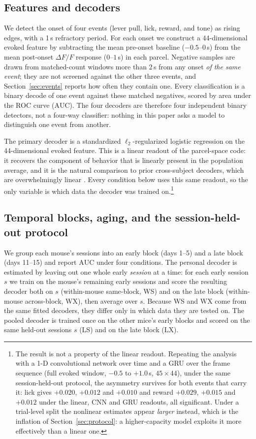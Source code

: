 \documentclass[mlmain,onecolumn]{jmlr}
\newcommand{\auc}{\mathrm{AUC}}
\begin{document}
\subsection{Features and decoders}
We detect the onset of four events (lever pull, lick, reward, and
tone) as rising edges, with a 1\,s refractory period. For each onset we construct a 44-dimensional
evoked feature by subtracting the mean pre-onset baseline ($-0.5$--$0$\,s) from the mean post-onset
$\Delta F/F$ response ($0$--$1$\,s) in each parcel. Negative samples are drawn from matched-count
windows more than 2\,s from any onset \emph{of the same event}; they are not screened against the
other three events, and Section~\ref{sec:events} reports how often they contain one. Every
classification is a binary decode of one event against these matched negatives, scored by area under
the ROC curve ($\auc$). The four decoders are therefore four independent binary detectors, not a
four-way classifier: nothing in this paper asks a model to distinguish one event from another.

The primary decoder is a standardized $\ell_2$-regularized logistic regression on
the 44-dimensional evoked feature. This is a linear readout of the parcel-space code: it recovers the
component of behavior that is linearly present in the population average, and it is the natural
comparison to prior cross-subject decoders, which are overwhelmingly linear
\citep{melbaum2022,peterson2021}. Every condition below uses this same readout, so the only variable
is which data the decoder was trained on.\footnote{The result is not a property of the linear
readout. Repeating the analysis with a 1-D convolutional network over time and a GRU over the frame
sequence (full evoked window, $-0.5$ to $+1.0$\,s, $45 \times 44$), under the same session-held-out
protocol, the asymmetry survives for both events that carry it: lick gives $+0.020$, $+0.012$ and
$+0.010$ and reward $+0.029$, $+0.015$ and $+0.012$ under the linear, CNN and GRU readouts, all
significant. Under a trial-level split the nonlinear estimates appear \emph{larger} instead, which is
the inflation of Section~\ref{sec:protocol}: a higher-capacity model exploits it more effectively
than a linear one.}

\subsection{Temporal blocks, aging, and the session-held-out protocol}
\label{sec:blocks}
We group each mouse's sessions into an early block (days 1--5)
and a late block (days 11--15) and report $\auc$ under four conditions. The personal decoder is
estimated by leaving out one whole early \emph{session} at a time: for each early session $s$ we
train on the mouse's remaining early sessions and score the resulting decoder both on $s$
(within-mouse same-block, WS) and on the late block (within-mouse across-block, WX), then average
over $s$. Because WS and WX come from the same fitted decoders, they differ only in which data they
are tested on. The pooled decoder is trained once on the other mice's early blocks and scored on the
same held-out sessions $s$ (LS) and on the late block (LX).
\end{document}
